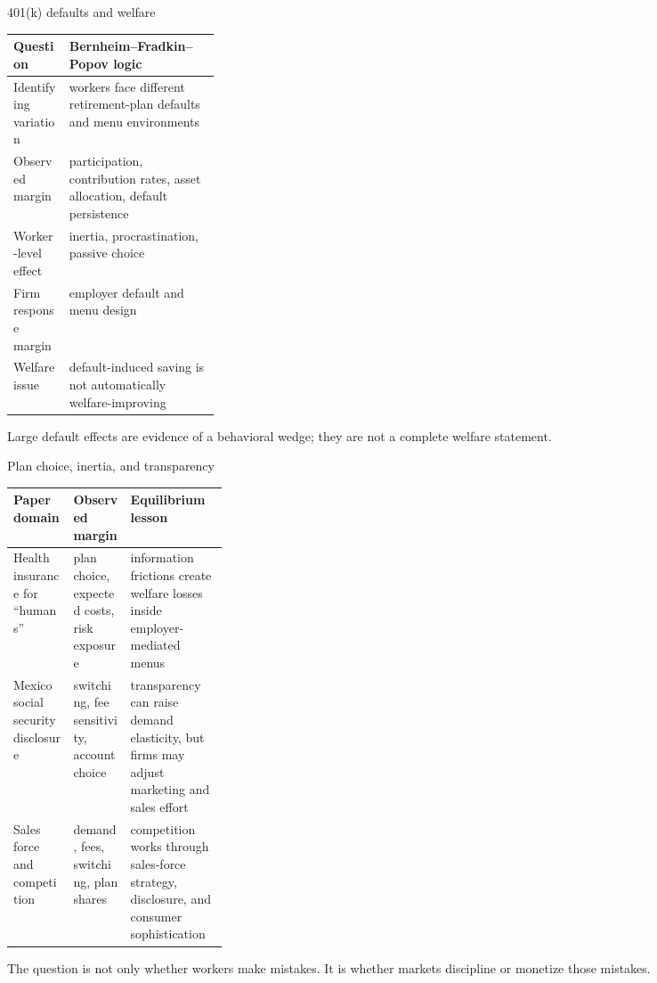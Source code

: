 \documentclass[aspectratio=169,11pt]{beamer}
\begin{document}
\begin{frame}{401(k) defaults and welfare}
\small
\begin{tabularx}{\linewidth}{p{0.27\linewidth} Y}
\toprule
Question & Bernheim--Fradkin--Popov logic \\
\midrule
Identifying variation & workers face different retirement-plan defaults and menu environments \\
Observed margin & participation, contribution rates, asset allocation, default persistence \\
Worker-level effect & inertia, procrastination, passive choice \\
Firm response margin & employer default and menu design \\
Welfare issue & default-induced saving is not automatically welfare-improving \\
\bottomrule
\end{tabularx}

\vspace{0.6em}
Large default effects are evidence of a behavioral wedge; they are not a complete welfare statement.
\end{frame}

\begin{frame}{Plan choice, inertia, and transparency}
\scriptsize
\begin{tabularx}{\linewidth}{p{0.28\linewidth} Y Y}
\toprule
Paper domain & Observed margin & Equilibrium lesson \\
\midrule
Health insurance for ``humans'' & plan choice, expected costs, risk exposure & information frictions create welfare losses inside employer-mediated menus \\
Mexico social security disclosure & switching, fee sensitivity, account choice & transparency can raise demand elasticity, but firms may adjust marketing and sales effort \\
Sales force and competition & demand, fees, switching, plan shares & competition works through sales-force strategy, disclosure, and consumer sophistication \\
\bottomrule
\end{tabularx}

\vspace{0.6em}
The question is not only whether workers make mistakes. It is whether markets discipline or monetize those mistakes.
\end{frame}
\end{document}

